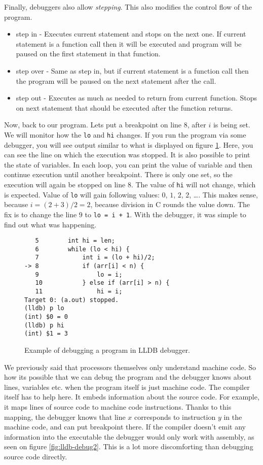 Finally, debuggers also allow \textit{stepping}. This also modifies the control flow of the program.
\begin{itemize}
    \item step in - Executes current statement and stops on the next one. If current statement is a function call then
                    it will be executed and program will be paused on the first statement in that function.
    \item step over - Same as step in, but if current statement is a function call then the program will
                      be paused on the next statement after the call.
    \item step out -  Executes as much as needed to return from current function. Stops on next statement that
                      should be executed after the function returns.
\end{itemize}

Now, back to our program. Lets put a breakpoint on line $8$, after $i$ is being set. We will monitor how the \texttt{lo} and \texttt{hi}
changes. If you run the program via some debugger, you will see output similar to what is displayed on figure \ref{fig:lldb-debug1}.
Here, you can see the line on which the execution was stopped. It is also possible to print the state of variables. In each loop,
you can print the value of variable and then continue execution until another breakpoint. There is only one set, so the execution will
again be stopped on line $8$. The value of \texttt{hi} will not change, which is expected. Value of \texttt{lo} will gain following values:
$0$, $1$, $2$, $2$, \dots. This makes sense, because $i = (2 + 3)/2 = 2$, because division in C rounds the value down. The fix is to change the
line $9$ to \texttt{lo = i + 1}. With the debugger, it was simple to find out what was happening.

\begin{figure}\label{fig:lldb-debug1}
\begin{verbatim}
   5   	    int hi = len;
   6   	    while (lo < hi) {
   7   	        int i = (lo + hi)/2;
-> 8   	        if (arr[i] < n) {
   9   	            lo = i;
   10  	        } else if (arr[i] > n) {
   11  	            hi = i;
Target 0: (a.out) stopped.
(lldb) p lo
(int) $0 = 0
(lldb) p hi
(int) $1 = 3
\end{verbatim}
\caption{Example of debugging a program in LLDB debugger.}
\end{figure}

We previously said that processors themselves only understand machine code. So how its possible that we can debug the program and the debugger knows about lines, variables etc. when the program itself is just machine code. The compiler itself has to help here. It embeds information about the source code. For example, it maps lines of source code to machine code instructions. Thanks to this mapping, the debugger knows that line $x$ corresponds to instruction $y$ in the machine code, and can put breakpoint there.
If the compiler doesn't emit any information into the executable the debugger would only work with assembly, as seen on figure \ref{fig:lldb-debug2}. This
is a lot more discomforting than debugging source code directly.

